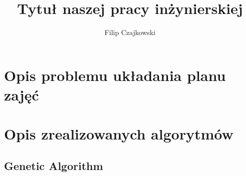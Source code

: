 \documentclass[11pt]{report}
\title{Tytuł naszej pracy inżynierskiej}
\begin{document}
%
%

\maketitle
\tableofcontents


\chapter{Opis problemu układania planu zajęć}





\chapter{Opis zrealizowanych algorytmów}




\section{Genetic Algorithm}
\author{Filip Czajkowski}
\end{document}

